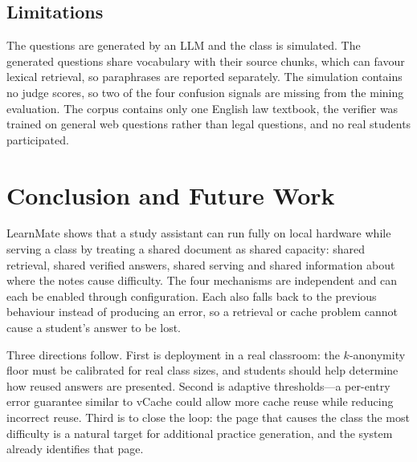 \documentclass[conference]{IEEEtran}
\newcommand{\sys}{LearnMate}
\begin{document}
\subsection{Limitations}

The questions are generated by an LLM and the class is simulated. The generated questions share
vocabulary with their source chunks, which can favour lexical retrieval, so paraphrases are reported
separately. The simulation contains no judge scores, so two of the four confusion signals are missing
from the mining evaluation. The corpus contains only one English law textbook, the verifier was
trained on general web questions rather than legal questions, and no real students participated.

\section{Conclusion and Future Work}

\sys{} shows that a study assistant can run fully on local hardware while serving a class by
treating a shared document as shared capacity: shared retrieval, shared verified answers, shared
serving and shared information about where the notes cause difficulty. The four mechanisms are
independent and can each be enabled through configuration. Each also falls back to the previous
behaviour instead of producing an error, so a retrieval or cache problem cannot cause a student's
answer to be lost.

Three directions follow. First is deployment in a real classroom: the $k$-anonymity floor must be
calibrated for real class sizes, and students should help determine how reused answers are presented.
Second is adaptive thresholds---a per-entry error guarantee similar to vCache
\cite{schroeder2025vcache} could allow more cache reuse while reducing incorrect reuse. Third is to
close the loop: the page that causes the class the most difficulty is a natural target for additional
practice generation, and the system already identifies that page.



\end{document}
